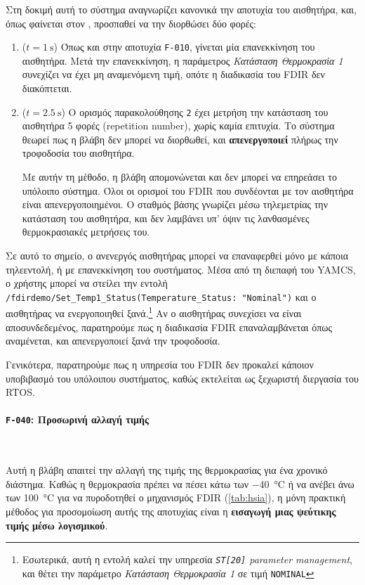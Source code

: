 \documentclass[a4paper,nobib]{tufte-book}
\begin{document}
Στη δοκιμή αυτή το σύστημα αναγνωρίζει κανονικά την αποτυχία του αισθητήρα, και, όπως φαίνεται στον , προσπαθεί να την διορθώσει δύο φορές:
\begin{enumerate}
	\item (\( t = \SI{1}{\second} \)) Όπως και στην αποτυχία \texttt{F-010}, γίνεται μία επανεκκίνηση του αισθητήρα. Μετά την επανεκκίνηση, η παράμετρος \emph{Κατάσταση Θερμοκρασία 1} συνεχίζει να έχει μη αναμενόμενη τιμή, οπότε η διαδικασία του \acs{FDIR} δεν διακόπτεται.
	\item (\( t = \SI{2.5}{\second} \)) Ο ορισμός παρακολούθησης \texttt{2} έχει μετρήση την κατάσταση του αισθητήρα 5 φορές (repetition number), χωρίς καμία επιτυχία. Το σύστημα θεωρεί πως η βλάβη δεν μπορεί να διορθωθεί, και \textbf{απενεργοποιεί} πλήρως την τροφοδοσία του αισθητήρα.
	
	Με αυτήν τη μέθοδο, η βλάβη απομονώνεται και δεν μπορεί να επηρεάσει το υπόλοιπο σύστημα. Όλοι οι ορισμοί του \acs{FDIR} που συνδέονται με τον αισθητήρα είναι απενεργοποιημένοι. Ο σταθμός βάσης γνωρίζει μέσω τηλεμετρίας την κατάσταση του αισθητήρα, και δεν λαμβάνει υπ' όψιν τις λανθασμένες θερμοκρασιακές μετρήσεις του.
\end{enumerate}

Σε αυτό το σημείο, ο ανενεργός αισθητήρας μπορεί να επαναφερθεί μόνο με κάποια τηλεεντολή, ή με επανεκκίνηση του συστήματος. Μέσα από τη διεπαφή του \acs{YAMCS}, ο χρήστης μπορεί να στείλει την εντολή \texttt{/fdirdemo/Set_Temp1_Status(Temperature_Status: "Nominal")} και ο αισθητήρας να ενεργοποιηθεί ξανά.\footnote{Εσωτερικά, αυτή η εντολή καλεί την υπηρεσία \emph{\texttt{ST[20]} parameter management}, και θέτει την παράμετρο \emph{Κατάσταση Θερμοκρασία 1} σε τιμή \texttt{NOMINAL}} Αν ο αισθητήρας συνεχίσει να είναι αποσυνδεδεμένος, παρατηρούμε πως η διαδικασία \acs{FDIR} επαναλαμβάνεται όπως αναμένεται, και απενεργοποιεί ξανά την τροφοδοσία.

Γενικότερα, παρατηρούμε πως η υπηρεσία του \acs{FDIR} δεν προκαλεί κάποιον υποβιβασμό του υπόλοιπου συστήματος, καθώς εκτελείται ως ξεχωριστή διεργασία του \acs{RTOS}.

\clearpage
\paragraph{\textbf{\texttt{F-040}: Προσωρινή αλλαγή τιμής}}~

Αυτή η βλάβη απαιτεί την αλλαγή της τιμής της θερμοκρασίας για ένα χρονικό διάστημα. Καθώς η θερμοκρασία πρέπει να πέσει κάτω των \SI{-40}{\celsius} ή να ανέβει άνω των \SI{100}{\celsius} για να πυροδοτηθεί ο μηχανισμός \acs{FDIR} (\cref{tab:hsia}), η μόνη πρακτική μέθοδος για προσομοίωση αυτής της αποτυχίας είναι η \textbf{εισαγωγή μιας ψεύτικης τιμής μέσω λογισμικού}.
\end{document}
